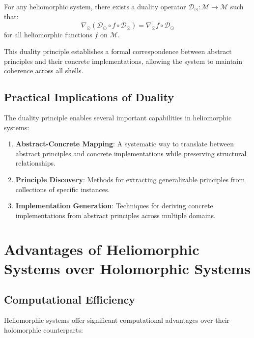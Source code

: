 \begin{theorem}
For any heliomorphic system, there exists a duality operator $\mathcal{D}_{\odot}: \mathcal{M} \rightarrow \mathcal{M}$ such that:
\begin{equation}
\nabla_{\odot} (\mathcal{D}_{\odot} \circ f \circ \mathcal{D}_{\odot}) = \overline{\nabla_{\odot} f} \circ \mathcal{D}_{\odot}
\end{equation}
for all heliomorphic functions $f$ on $\mathcal{M}$.
\end{theorem}

This duality principle establishes a formal correspondence between abstract principles and their concrete implementations, allowing the system to maintain coherence across all shells.

\subsection{Practical Implications of Duality}

The duality principle enables several important capabilities in heliomorphic systems:

\begin{enumerate}
    \item \textbf{Abstract-Concrete Mapping}: A systematic way to translate between abstract principles and concrete implementations while preserving structural relationships.
    
    \item \textbf{Principle Discovery}: Methods for extracting generalizable principles from collections of specific instances.
    
    \item \textbf{Implementation Generation}: Techniques for deriving concrete implementations from abstract principles across multiple domains.
\end{enumerate}

\section{Advantages of Heliomorphic Systems over Holomorphic Systems}

\subsection{Computational Efficiency}

Heliomorphic systems offer significant computational advantages over their holomorphic counterparts:

